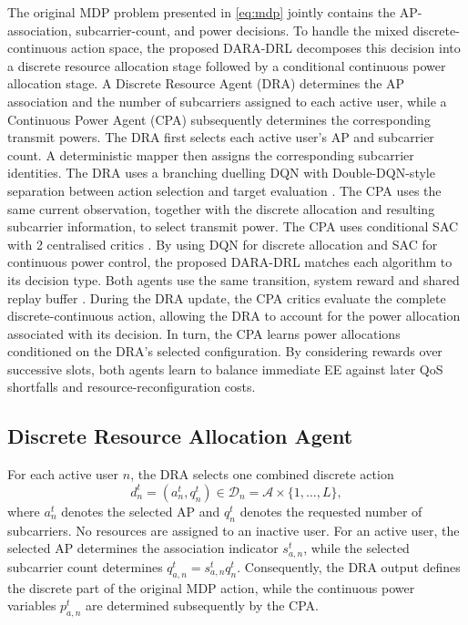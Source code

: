 \documentclass[journal]{IEEEtran}
\begin{document}
The original MDP problem presented in \eqref{eq:mdp} jointly contains the
AP-association, subcarrier-count, and power decisions. To handle the
mixed discrete-continuous action space, the proposed DARA-DRL decomposes this
decision into a discrete resource allocation stage followed by a
conditional continuous power allocation stage. A Discrete Resource Agent (DRA) determines the
AP association and the number of subcarriers assigned to each active
user, while a Continuous Power
Agent (CPA) subsequently determines the corresponding
transmit powers.  The DRA first selects each active user's
AP and subcarrier count. A deterministic mapper then assigns
the corresponding subcarrier identities. The DRA uses a branching duelling DQN with Double-DQN-style
separation between action selection and target evaluation
\cite{Mnih2015DQN,VanHasselt2016DoubleDQN,Wang2016Dueling,Tavakoli2018Branching}. The CPA uses the same current observation, together with the discrete allocation and resulting subcarrier information, to select transmit power. The CPA uses conditional SAC with 2 centralised critics \cite{Haarnoja2018SAC}. By using DQN for discrete allocation and SAC for continuous power
control, the proposed DARA-DRL matches each algorithm to its decision type. Both agents use the same transition, system reward and shared
replay buffer \cite{Mnih2015DQN,Haarnoja2018SAC}. During the DRA
update, the CPA critics evaluate the complete discrete-continuous
action, allowing the DRA to account for the power allocation
associated with its decision. In turn, the CPA learns power
allocations conditioned on the DRA's selected configuration. By considering rewards over successive slots, both agents learn to balance immediate EE against later QoS shortfalls and resource-reconfiguration costs.

\subsection{Discrete Resource Allocation Agent}

For each active user $n$, the DRA selects one
combined discrete action
\begin{equation}
    d_{n}^{t}
    =
    (a_{n}^{t},q_{n}^{t})
    \in\mathcal{D}_{n}
    =
    \mathcal{A}\times\{1,\ldots,L\},
    \label{eq:discrete_user_action}
\end{equation}
where $a_{n}^{t}$ denotes the selected AP and $q_{n}^{t}$ denotes the requested number of subcarriers. No resources are assigned to an inactive user. For an active user, the selected AP determines the association indicator $s_{a,n}^{t}$, while the selected subcarrier count determines $q_{a,n}^{t}
    =
    s_{a,n}^{t}q_{n}^{t}.$
Consequently, the DRA output defines the discrete part of the original
MDP action, while the continuous power variables $p_{a,n}^{t}$ are
determined subsequently by the CPA.
\end{document}
